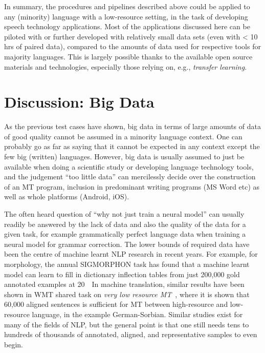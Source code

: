 \documentclass[free]{flammie}
\begin{document}
In summary, the procedures and pipelines described above could be applied to any
(minority) language with a low-resource setting, in the task of developing
speech technology applications. Most of the applications discussed here can be
piloted with or further developed with relatively small data sets (even with <
10 hrs of paired data), compared to the amounts of data used for respective
tools for majority languages. This is largely possible thanks to the available
open source materials and technologies, especially those relying on, e.g.,
\textit{transfer learning}.









\section{Discussion: Big Data}

As the previous test cases have shown, big data in terms of large amounts of
data of good quality cannot be assumed in a minority language context. One can
probably go as far as saying that it cannot be expected in any context except
the few big (written) languages. However, big data is usually assumed to just be
available when doing a scientific study or developing language technology tools,
and the judgement ``too little data'' can mercilessly decide over the
construction of an MT program, inclusion in predominant writing programs (MS
Word etc) as well as whole platforms (Android, iOS).


The often heard question of ``why not just train a neural model'' can usually
readily be answered by the lack of data and also the quality of the data for a
given task, for example grammatically perfect language data when training a
neural model for grammar correction. The lower bounds of required data have been
the centre of machine learnt NLP research in recent years. For example, for
morphology, the annual SIGMORPHON task has found that a machine learnt model can
learn to fill in dictionary inflection tables from just 200,000 gold annotated
examples at 20~\ In machine translation, similar results have been shown in WMT
shared task on \textit{very low resource MT}~\cite{fraser-2020-findings}, where
it is shown that 60,000 aligned sentences is sufficient for MT between
high-resource and low-resource language, in the example German-Sorbian.  Similar
studies exist for many of the fields of NLP, but the general point is that one
still needs tens to hundreds of thousands of annotated, aligned, and
representative samples to even begin.
\end{document}
